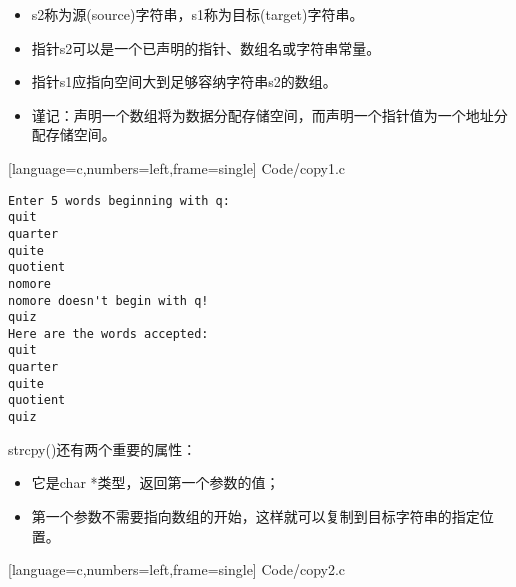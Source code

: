 \begin{frame}[fragile] 
\begin{itemize}
\item
{\tf s2}称为源(source)字符串，{\tf s1}称为目标(target)字符串。
\\[0.1in]
\item
指针{\tf s2}可以是一个已声明的指针、数组名或字符串常量。\\[0.1in]
\item
指针{\tf s1}应指向空间大到足够容纳字符串{\tf s2}的数组。\\[0.1in]
\item[]
\textcolor{acolor3}{谨记：声明一个数组将为数据分配存储空间，而声明一个指针值为一个地址分配存储空间。}
\end{itemize}
\end{frame}

\begin{frame}

[language=c,numbers=left,frame=single]
{Code/copy1.c}

\end{frame}


\begin{frame}[fragile]
\begin{lstlisting}[backgroundcolor=\color{blue!20}]
Enter 5 words beginning with q:
quit
quarter
quite
quotient
nomore
nomore doesn't begin with q!
quiz
Here are the words accepted:
quit
quarter
quite
quotient
quiz
\end{lstlisting}

\end{frame}

\begin{frame}[fragile] 
{\tf strcpy()}还有两个重要的属性：\vspace{0.1in}
\begin{itemize}
\item 它是{\tf char *}类型，返回第一个参数的值； \\[0.1in]
\item 第一个参数不需要指向数组的开始，这样就可以复制到目标字符串的指定位置。
\end{itemize}
\end{frame}

\begin{frame}[fragile]

[language=c,numbers=left,frame=single]
{Code/copy2.c}
\end{frame}

